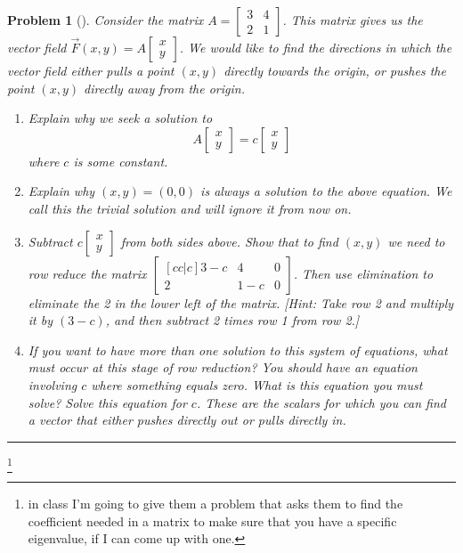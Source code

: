\documentclass[letterpaper,oneside]{book}%
\let\oldmarginpar\marginpar
\renewcommand\marginpar[1]{\-\oldmarginpar{\raggedright\footnotesize #1}}
\renewcommand{\thefootnote}{\roman{footnote}}
\newcommand{\note}[1]{\footnote{#1}\marginpar{\fbox{\textbf{\thefootnote}}}}
\newcommand{\note}[1]{}
\theoremstyle{plain}
\theoremstyle{box}
\theoremstyle{problem}
\newtheorem{problemnum}{Problem}[chapter]
\newenvironment{problem}[1][]{\begin{problemnum}[#1]}{\end{problemnum}\nopagebreak\hrule\bigskip}
\newcommand{\bvec}[1]{\begin{bmatrix} #1 \end{bmatrix}}
\begin{document}
\begin{problem}
Consider the matrix 
$A=\bvec{3&4\\2&1}$.  This matrix gives us the vector field $\vec F(x,y) = A\bvec{x\\y}$. We would like to find the directions in which the vector field either pulls a point $(x,y)$ directly towards the origin, or pushes the point $(x,y)$ directly away from the origin.
\begin{enumerate}
 \item Explain why we seek a solution to $$ A\bvec{x\\y} = c\bvec{x\\y}$$ where $c$ is some constant. 
 \item Explain why $(x,y)=(0,0)$ is always a solution to the above equation.  We call this the trivial solution and will ignore it from now on.
 \item Subtract $c\bvec{x\\y}$ from both sides above.  Show that to find $(x,y)$ we need to row reduce the matrix $\bvec{[cc|c]3-c&4&0\\2&1-c&0}$. Then use elimination to eliminate the 2 in the lower left of the matrix. [Hint: Take row 2 and multiply it by $(3-c)$, and then subtract 2 times row 1 from row 2.]
 \item If you want to have more than one solution to this system of equations, what must occur at this stage of row reduction?  You should have an equation involving $c$ where something equals zero.  What is this equation you must solve? Solve this equation for $c$.  These are the scalars for which you can find a vector that either pushes directly out or pulls directly in.
\end{enumerate}

\end{problem}


\note{in class I'm going to give them a problem that asks them to find the coefficient needed in a matrix to make sure that you have a specific eigenvalue, if I can come up with one.}
\end{document}
